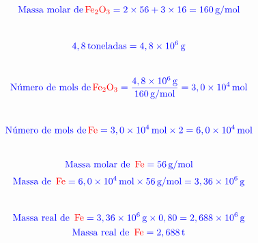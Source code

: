 \documentclass[a4paper, 12pt]{article}
\begin{document}
\begin{enumerate}
          \[
              \textcolor{blue}{\text{Massa molar de} \, \textcolor{red}{\text{Fe}_2\text{O}_3} = 2 \times 56 + 3 \times 16 = 160 \, \text{g/mol}}
          \]
          \\[10pt]
          \textcolor{blue}{}
          \[
              \textcolor{blue}{4,8 \, \text{toneladas} = 4,8 \times 10^6 \, \text{g}}
          \]
          \\[10pt]
          \textcolor{blue}{}
          \[
              \textcolor{blue}{\text{Número de mols de} \, \textcolor{red}{\text{Fe}_2\text{O}_3} = \frac{4,8 \times 10^6 \, \text{g}}{160 \, \text{g/mol}} = 3,0 \times 10^4 \, \text{mol}}
          \]
          \\[10pt]
          \textcolor{blue}{}
          \[
              \textcolor{blue}{\text{Número de mols de} \, \textcolor{red}{\text{Fe}} = 3,0 \times 10^4 \, \text{mol} \times 2 = 6,0 \times 10^4 \, \text{mol}}
          \]
          \\[10pt]
          \textcolor{blue}{}
          \[
              \textcolor{blue}{\text{Massa molar de } \, \textcolor{red}{\text{Fe}} = 56 \, \text{g/mol}}
          \]
          \[
              \textcolor{blue}{\text{Massa de }  \, \textcolor{red}{\text{Fe}} = 6,0 \times 10^4 \, \text{mol} \times 56 \, \text{g/mol} = 3,36 \times 10^6 \, \text{g}}
          \]
          \\[10pt]
          \textcolor{blue}{}
          \[
              \textcolor{blue}{\text{Massa real de } \, \textcolor{red}{\text{Fe}} = 3,36 \times 10^6 \, \text{g} \times 0,80 = 2,688 \times 10^6 \, \text{g}}
          \]
          \[
              \textcolor{blue}{\text{Massa real de } \, \textcolor{red}{\text{Fe}} = 2,688 \, \text{t}}
          \]





\end{enumerate}
\end{document}
